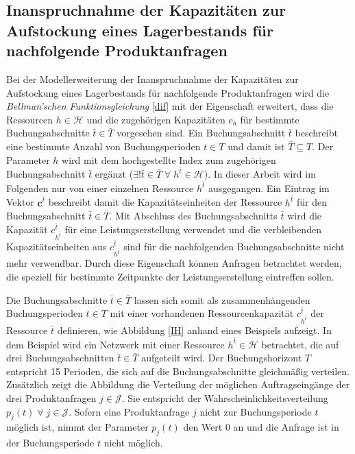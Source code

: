 \subsection{Inanspruchnahme der Kapazitäten zur Aufstockung eines Lagerbestands für nachfolgende Produktanfragen}

Bei der Modellerweiterung der Inanspruchnahme der Kapazitäten zur Aufstockung eines Lagerbestands für nachfolgende Produktanfragen wird die \textit{Bellman'schen Funktionsgleichung} \ref{dif} mit der Eigenschaft erweitert, dass die Ressourcen $h\in\mathcal{H}$ und die zugehörigen Kapazitäten $c_{h}$ für bestimmte Buchungsabschnitte $\bar{t}\in \bar{T}$ vorgesehen sind. Ein Buchungsabschnitt $\bar{t}$ beschreibt eine bestimmte Anzahl von Buchungsperioden $t\in T$ und damit ist $\bar{T}\subseteq T$. Der Parameter $h$ wird mit dem hochgestellte Index zum zugehörigen Buchungsabschnitt $\bar{t}$ ergänzt ($\exists{!\bar{t}}\in\bar{T}\; \forall\; h^{\bar{t}}\in\mathcal{H}$). In dieser Arbeit wird im Folgenden nur von einer einzelnen Ressource $h^{\bar{t}}$ ausgegangen. Ein Eintrag im Vektor $\textbf{c}^{\bar{t}}$ beschreibt damit die Kapazitätseinheiten der Ressource $h^{\bar{t}}$ für den Buchungsabschnitt $\bar{t}\in\bar{T}$. Mit Abschluss des Buchungsabschnitts $\bar{t}$ wird die Kapazität $c^{\bar{t}}_{h^{\bar{t}}}$ für eine Leistungserstellung verwendet und die verbleibenden Kapazitätseinheiten aus $c^{\bar{t}}_{h^{\bar{t}}}$ sind für die nachfolgenden Buchungsabschnitte nicht mehr verwendbar. Durch diese Eigenschaft können Anfragen betrachtet werden, die speziell für bestimmte Zeitpunkte der Leistungserstellung eintreffen sollen. 

Die Buchungsabschnitte $\bar{t}\in \bar{T}$ lassen sich somit als zusammenhängenden Buchungsperioden $t\in T$ mit einer vorhandenen Ressourcenkapazität $c^{\bar{t}}_{h^{\bar{t}}}$ der Ressource $\bar{t}$ definieren, wie Abbildung \ref{IH} anhand eines Beispiels aufzeigt. In dem Beispiel wird ein Netzwerk mit einer Ressource $h^{\bar{t}}\in\mathcal{H}$ betrachtet, die auf drei Buchungsabschnitten $\bar{t}\in\bar{T}$ aufgeteilt wird. Der Buchungshorizont $T$ entspricht 15 Perioden, die sich auf die Buchungsabschnitte gleichmäßig verteilen. Zusätzlich zeigt die Abbildung die Verteilung der möglichen Auftragseingänge der drei Produktanfragen $j\in\mathcal{J}$. Sie entspricht der Wahrscheinlichkeitsverteilung $p_j(t)\; \forall\; j\in\mathcal{J}$. Sofern eine Produktanfrage $j$ nicht zur Buchungsperiode $t$ möglich ist, nimmt der Parameter $p_j(t)$ den Wert $0$ an und die Anfrage ist in der Buchungsperiode $t$ nicht möglich. 


